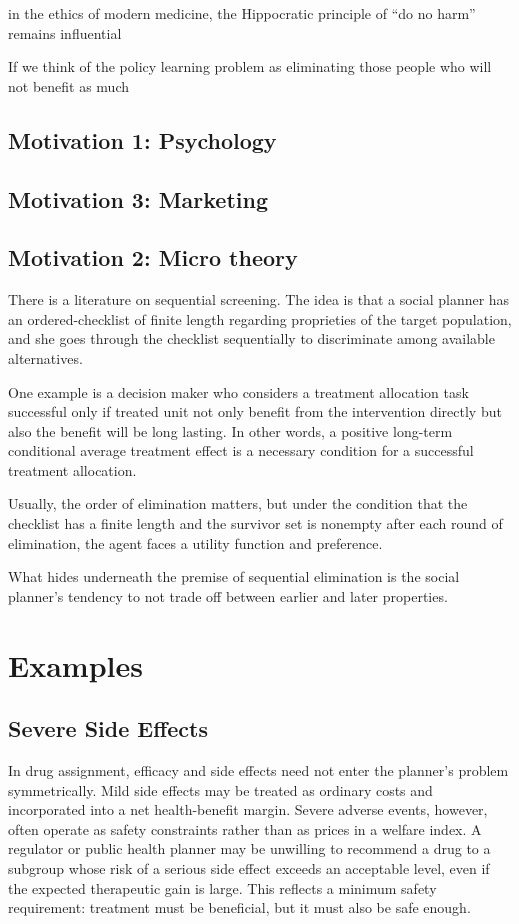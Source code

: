 \documentclass[12pt]{article}
\newcommand{\1}{\mathbf{1}}
\begin{document}
in the ethics of modern medicine, the Hippocratic principle of “do no harm” remains influential

If we think of the policy learning problem as eliminating those people who will not benefit as much 


\subsection{Motivation 1: Psychology}
\subsection{Motivation 3: Marketing}
\subsection{Motivation 2: Micro theory}
There is a literature on sequential screening. The idea is that a social planner has an ordered-checklist of finite length regarding proprieties of the target population, and she goes through the checklist sequentially to discriminate among available alternatives. 

One example is a decision maker who considers a treatment allocation task successful only if treated unit not only benefit from the intervention directly but also the benefit will be long lasting. In other words, a positive long-term conditional average treatment effect is a necessary condition for a successful treatment allocation. 

Usually, the order of elimination matters, but under the condition that the checklist has a finite length and the survivor set is nonempty after each round of elimination, the agent faces a utility function and preference.

What hides underneath the premise of sequential elimination is the social planner's tendency to not trade off between earlier and later properties. 

\section{Examples}

\subsection{Severe Side Effects}
In drug assignment, efficacy and side effects need not enter the planner’s problem symmetrically. Mild side effects may be treated as ordinary costs and incorporated into a net health-benefit margin. Severe adverse events, however, often operate as safety constraints rather than as prices in a welfare index. A regulator or public health planner may be unwilling to recommend a drug to a subgroup whose risk of a serious side effect exceeds an acceptable level, even if the expected therapeutic gain is large. This reflects a minimum safety requirement: treatment must be beneficial, but it must also be safe enough. 
\end{document}
